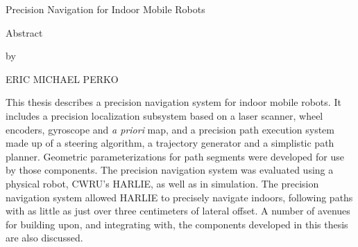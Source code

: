 \begin{center}
    Precision Navigation for Indoor Mobile Robots

    \vspace{0.1\textheight}

    Abstract

    by

    ERIC MICHAEL PERKO
\end{center}

This thesis describes a precision navigation system for indoor mobile robots. It includes a precision localization subsystem based on a laser scanner, wheel encoders, gyroscope and \emph{a priori} map, and a precision path execution system made up of a steering algorithm, a trajectory generator and a simplistic path planner. Geometric parameterizations for path segments were developed for use by those components. The precision navigation system was evaluated using a physical robot, CWRU's HARLIE, as well as in simulation. The precision navigation system allowed HARLIE to precisely navigate indoors, following paths with as little as just over three centimeters of lateral offset. A number of avenues for building upon, and integrating with, the components developed in this thesis are also discussed.